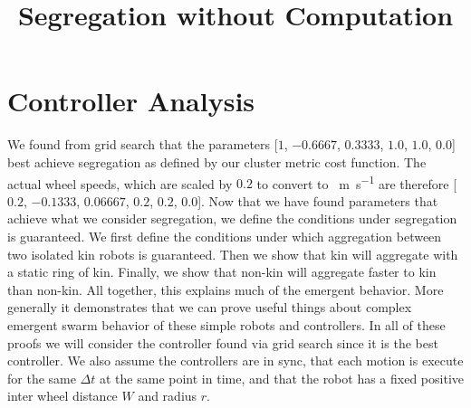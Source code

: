 \documentclass[conference]{IEEEtran}
\begin{document}
\title{Segregation without Computation}

\author{
}

\maketitle

\section{Controller Analysis}

  We found from grid search that the parameters [$1$, $-0.6667$, $0.3333$, $1.0$, $1.0$, $0.0$] best achieve segregation as defined by our cluster metric cost function. The actual wheel speeds, which are scaled by $0.2$ to convert to \SI{}{\meter\per\second} are therefore [$0.2$, $-0.1333$, $0.06667$, $0.2$, $0.2$, $0.0$]. Now that we have found parameters that achieve what we consider segregation, we define the conditions under segregation is guaranteed. We first define the conditions under which aggregation between two isolated kin robots is guaranteed. Then we show that kin will aggregate with a static ring of kin. Finally, we show that non-kin will aggregate faster to kin than non-kin. All together, this explains much of the emergent behavior. More generally it demonstrates that we can prove useful things about complex emergent swarm behavior of these simple robots and controllers. In all of these proofs we will consider the controller found via grid search since it is the best controller. We also assume the controllers are in sync, that each motion is execute for the same $\Delta t$ at the same point in time, and that the robot has a fixed positive inter wheel distance $W$ and radius $r$.
\end{document}

